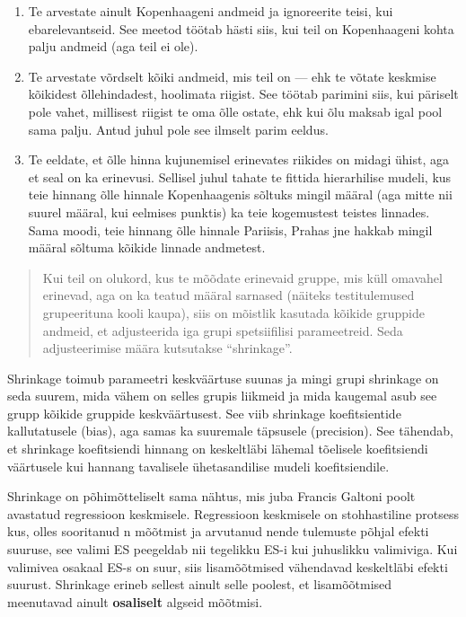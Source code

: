 \documentclass[]{book}
\begin{document}
\begin{enumerate}
\def\labelenumi{\arabic{enumi}.}
\item
  Te arvestate ainult Kopenhaageni andmeid ja ignoreerite teisi, kui
  ebarelevantseid. See meetod töötab hästi siis, kui teil on
  Kopenhaageni kohta palju andmeid (aga teil ei ole).
\item
  Te arvestate võrdselt kõiki andmeid, mis teil on --- ehk te võtate
  keskmise kõikidest õllehindadest, hoolimata riigist. See töötab
  parimini siis, kui päriselt pole vahet, millisest riigist te oma õlle
  ostate, ehk kui õlu maksab igal pool sama palju. Antud juhul pole see
  ilmselt parim eeldus.
\item
  Te eeldate, et õlle hinna kujunemisel erinevates riikides on midagi
  ühist, aga et seal on ka erinevusi. Sellisel juhul tahate te fittida
  hierarhilise mudeli, kus teie hinnang õlle hinnale Kopenhaagenis
  sõltuks mingil määral (aga mitte nii suurel määral, kui eelmises
  punktis) ka teie kogemustest teistes linnades. Sama moodi, teie
  hinnang õlle hinnale Pariisis, Prahas jne hakkab mingil määral sõltuma
  kõikide linnade andmetest.
\end{enumerate}

\begin{quote}
Kui teil on olukord, kus te mõõdate erinevaid gruppe, mis küll omavahel
erinevad, aga on ka teatud määral sarnased (näiteks testitulemused
grupeerituna kooli kaupa), siis on mõistlik kasutada kõikide gruppide
andmeid, et adjusteerida iga grupi spetsiifilisi parameetreid. Seda
adjusteerimise määra kutsutakse ``shrinkage''.
\end{quote}

Shrinkage toimub parameetri keskväärtuse suunas ja mingi grupi shrinkage
on seda suurem, mida vähem on selles grupis liikmeid ja mida kaugemal
asub see grupp kõikide gruppide keskväärtusest. See viib shrinkage
koefitsientide kallutatusele (bias), aga samas ka suuremale täpsusele
(precision). See tähendab, et shrinkage koefitsiendi hinnang on
keskeltläbi lähemal tõelisele koefitsiendi väärtusele kui hannang
tavalisele ühetasandilise mudeli koefitsiendile.

Shrinkage on põhimõtteliselt sama nähtus, mis juba Francis Galtoni poolt
avastatud regressioon keskmisele. Regressioon keskmisele on
stohhastiline protsess kus, olles sooritanud n mõõtmist ja arvutanud
nende tulemuste põhjal efekti suuruse, see valimi ES peegeldab nii
tegelikku ES-i kui juhuslikku valimiviga. Kui valimivea osakaal ES-s on
suur, siis lisamõõtmised vähendavad keskeltläbi efekti suurust.
Shrinkage erineb sellest ainult selle poolest, et lisamõõtmised
meenutavad ainult \textbf{osaliselt} algseid mõõtmisi.
\end{document}

